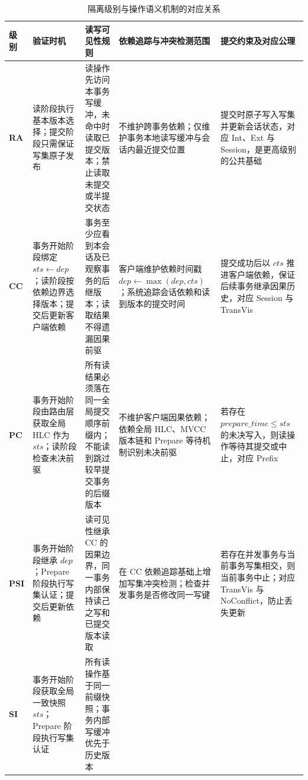 \begin{table}[htbp]
  \centering
  \scriptsize
  \setlength{\tabcolsep}{2pt}
  \renewcommand{\arraystretch}{1.28}
  \caption{隔离级别与操作语义机制的对应关系}
  \label{tab:isolation_customization}
  \begin{tabularx}{\textwidth}{|>{\centering\arraybackslash}p{1.15cm}|>{\raggedright\arraybackslash}p{2.05cm}|>{\raggedright\arraybackslash}p{2.55cm}|>{\raggedright\arraybackslash}p{2.65cm}|>{\raggedright\arraybackslash}X|}
    \hline
    \textbf{级别} & \textbf{验证时机} & \textbf{读写可见性规则} & \textbf{依赖追踪与冲突检测范围} & \textbf{提交约束及对应公理} \\
    \hline
    \textbf{RA}
                  & 读阶段执行基本版本选择；提交阶段只需保证写集原子发布
                  & 读操作先访问本事务写缓冲，未命中时读取已提交版本；禁止读取未提交或半提交状态
                  & 不维护跨事务依赖；仅维护事务本地读写缓冲与会话内最近提交位置
                  & 提交时原子写入写集并更新会话状态，对应 Int、Ext 与 Session，是更高级别的公共基础
    \\
    \hline
    \textbf{CC}
                  & 事务开始阶段绑定 $sts \gets dep$；读阶段按依赖边界选择版本；提交后更新客户端依赖
                  & 事务至少应看到本会话及已观察事务的后继版本；读取结果不得遗漏因果前驱
                  & 客户端维护依赖时间戳 $dep \gets \max(dep, cts)$；系统追踪会话依赖和读到版本的提交时间
                  & 提交成功后以 $cts$ 推进客户端依赖，保证后续事务继承因果历史，对应 Session 与 TransVis
    \\
    \hline
    \textbf{PC}
                  & 事务开始阶段由路由层获取全局 HLC 作为 $sts$；读阶段检查未决前驱
                  & 所有读结果必须落在同一全局提交顺序前缀内；不能读到跳过较早提交事务的后缀版本
                  & 不维护客户端因果依赖；依赖全局 HLC、MVCC 版本链和 Prepare 等待机制识别未决前驱
                  & 若存在 $prepare\_time \le sts$ 的未决写入，则读操作等待其提交或中止，对应 Prefix
    \\
    \hline
    \textbf{PSI}
                  & 事务开始阶段继承 $dep$；Prepare 阶段执行写集认证；提交后更新依赖
                  & 读可见性继承 CC 的因果边界，同一事务内部保持读己之写和已提交版本读取
                  & 在 CC 依赖追踪基础上增加写集冲突检测；检查并发事务是否修改同一写键
                  & 若存在并发事务与当前事务写集相交，则当前事务中止；对应 TransVis 与 NoConflict，防止丢失更新
    \\
    \hline
    \textbf{SI}
                  & 事务开始阶段获取全局一致快照 $sts$；Prepare 阶段执行写集认证
                  & 所有读操作基于同一前缀快照；事务内部写缓冲优先于历史版本

\end{tabularx}
\end{table}
